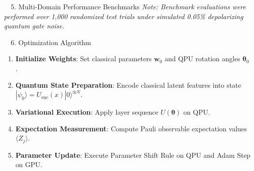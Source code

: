 \documentclass[a0,landscape]{a0poster}
\begin{document}
\begin{minipage}[t]{0.32\textwidth}
\begin{posterbox}{\faTable\ \ 5. Multi-Domain Performance Benchmarks}
    \vspace{0.4em}
    \textit{Note: Benchmark evaluations were performed over 1,000 randomized test trials under simulated 0.05\% depolarizing quantum gate noise.}
  \end{posterbox}

  \vspace{0.8cm}

  \begin{posterbox}{\faListOl\ \ 6. Optimization Algorithm}
    \begin{enumerate}[label=\textbf{Step \arabic*:.}, leftmargin=3em]
      \item \textbf{Initialize Weights}: Set classical parameters $\boldsymbol{w}_0$ and QPU rotation angles $\boldsymbol{\theta}_0$.
      \item \textbf{Quantum State Preparation}: Encode classical latent features into state $|\psi_0\rangle = U_{\text{enc}}(x)|0\rangle^{\otimes N}$.
      \item \textbf{Variational Execution}: Apply layer sequence $U(\boldsymbol{\theta})$ on QPU.
      \item \textbf{Expectation Measurement}: Compute Pauli observable expectation values $\langle Z_j \rangle$.
      \item \textbf{Parameter Update}: Execute Parameter Shift Rule on QPU and Adam Step on GPU.
    \end{enumerate}
  \end{posterbox}

\end{minipage}\hfill
\end{document}
